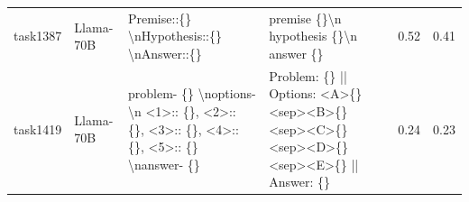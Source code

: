 \begin{longtable}{@{}p{0.8cm\tiny}p{1cm\tiny}p{4.1cm\ttfamily\tiny}p{4.1cm\ttfamily\tiny}p{0.8cm\tiny}p{0.8cm\tiny}@{}}
task1387  & Llama-70B  & Premise::\{\} \textbackslash{}nHypothesis::\{\} \textbackslash{}nAnswer::\{\}                                                                                                                                                                                                                                                                                                                                                                                                                                           & premise \{\}\textbackslash{}n hypothesis \{\}\textbackslash{}n answer \{\}                                                                                                                                                                                                                                                                                                                                                                                                                                                                                                        & 0.52 & 0.41 \\
task1419  & Llama-70B  & problem- \{\} \textbackslash{}noptions- \textbackslash{}n \textless{}1\textgreater{}:: \{\}, \textless{}2\textgreater{}:: \{\}, \textless{}3\textgreater{}:: \{\}, \textless{}4\textgreater{}:: \{\}, \textless{}5\textgreater{}:: \{\} \textbackslash{}nanswer- \{\}                                                                                                                                                                                                                                                   & Problem: \{\} || Options:  \textless{}A\textgreater \{\} \textless{}sep\textgreater \textless{}B\textgreater \{\} \textless{}sep\textgreater \textless{}C\textgreater \{\} \textless{}sep\textgreater \textless{}D\textgreater \{\} \textless{}sep\textgreater \textless{}E\textgreater \{\} || Answer: \{\}                                                                                                                                                                                                                                                                      & 0.24 & 0.23 \\

\end{longtable}
